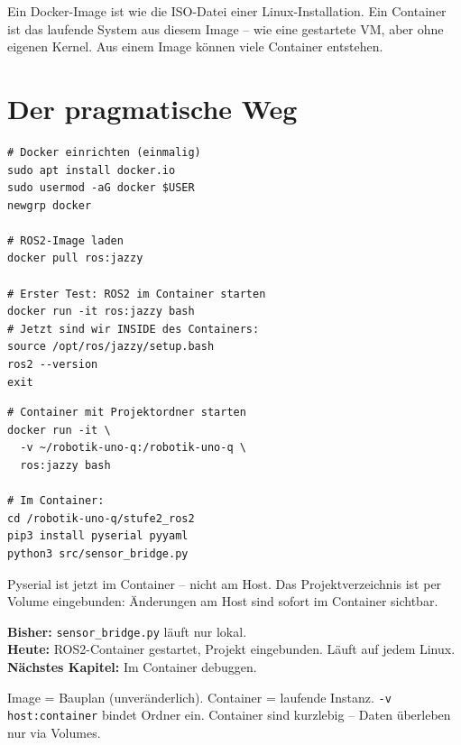 \begin{analogie}
Ein Docker-Image ist wie die ISO-Datei einer Linux-Installation.
Ein Container ist das laufende System aus diesem Image --
wie eine gestartete VM, aber ohne eigenen Kernel.
Aus einem Image können viele Container entstehen.
\end{analogie}

\section{Der pragmatische Weg}

\begin{lstlisting}[style=bash]
# Docker einrichten (einmalig)
sudo apt install docker.io
sudo usermod -aG docker $USER
newgrp docker

# ROS2-Image laden
docker pull ros:jazzy

# Erster Test: ROS2 im Container starten
docker run -it ros:jazzy bash
# Jetzt sind wir INSIDE des Containers:
source /opt/ros/jazzy/setup.bash
ros2 --version
exit
\end{lstlisting}

\begin{loesungBox}
\begin{lstlisting}[style=bash]
# Container mit Projektordner starten
docker run -it \
  -v ~/robotik-uno-q:/robotik-uno-q \
  ros:jazzy bash

# Im Container:
cd /robotik-uno-q/stufe2_ros2
pip3 install pyserial pyyaml
python3 src/sensor_bridge.py
\end{lstlisting}
Pyserial ist jetzt im Container -- nicht am Host.
Das Projektverzeichnis ist per Volume eingebunden:
Änderungen am Host sind sofort im Container sichtbar.
\end{loesungBox}

\begin{projektBox}
\textbf{Bisher:} \texttt{sensor\_bridge.py} läuft nur lokal.\\
\textbf{Heute:} ROS2-Container gestartet, Projekt eingebunden.
Läuft auf jedem Linux.\\
\textbf{Nächstes Kapitel:} Im Container debuggen.
\end{projektBox}

\begin{merksatzBox}
Image = Bauplan (unveränderlich).
Container = laufende Instanz.
\texttt{-v host:container} bindet Ordner ein.
Container sind kurzlebig -- Daten überleben nur via Volumes.
\end{merksatzBox}

